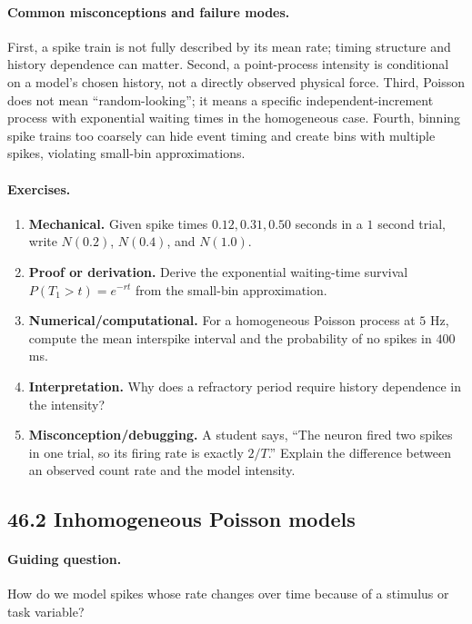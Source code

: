 \paragraph{Common misconceptions and failure modes.}
First, a spike train is not fully described by its mean rate; timing structure and history dependence can matter. Second, a point-process intensity is conditional on a model's chosen history, not a directly observed physical force. Third, Poisson does not mean ``random-looking''; it means a specific independent-increment process with exponential waiting times in the homogeneous case. Fourth, binning spike trains too coarsely can hide event timing and create bins with multiple spikes, violating small-bin approximations.

\paragraph{Exercises.}
\begin{enumerate}[label=\textbf{46.1.\arabic*.}, leftmargin=*]
\item \textbf{Mechanical.} Given spike times \(0.12,0.31,0.50\) seconds in a \(1\) second trial, write \(N(0.2)\), \(N(0.4)\), and \(N(1.0)\).
\item \textbf{Proof or derivation.} Derive the exponential waiting-time survival \(P(T_1>t)=e^{-rt}\) from the small-bin approximation.
\item \textbf{Numerical/computational.} For a homogeneous Poisson process at \(5\) Hz, compute the mean interspike interval and the probability of no spikes in \(400\) ms.
\item \textbf{Interpretation.} Why does a refractory period require history dependence in the intensity?
\item \textbf{Misconception/debugging.} A student says, ``The neuron fired two spikes in one trial, so its firing rate is exactly \(2/T\).'' Explain the difference between an observed count rate and the model intensity.
\end{enumerate}

\subsection{46.2 Inhomogeneous Poisson models}

\paragraph{Guiding question.}
How do we model spikes whose rate changes over time because of a stimulus or task variable?

